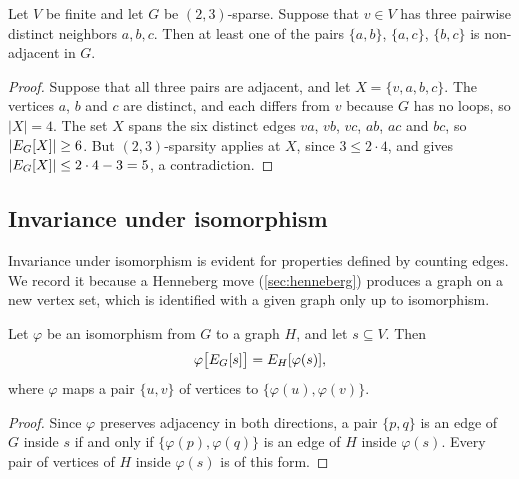 \begin{lemma}
  \label{lem:isSparse-exists-nonadj-among-three-neighbors}
  \leanok
  Let $V$ be finite and let $G$ be $(2,3)$-sparse. Suppose that
  $v \in V$ has three pairwise distinct neighbors $a, b, c$. Then at
  least one of the pairs $\{a, b\}$, $\{a, c\}$, $\{b, c\}$ is
  non-adjacent in $G$.
\end{lemma}
\begin{proof}
  \leanok
  Suppose that all three pairs are adjacent, and let
  $X = \{v, a, b, c\}$. The vertices $a$, $b$ and $c$ are distinct, and
  each differs from $v$ because $G$ has no loops, so $|X| = 4$. The set
  $X$ spans the six distinct edges $va$, $vb$, $vc$, $ab$, $ac$ and
  $bc$, so $|\edgesIn{X}| \ge 6$. But $(2,3)$-sparsity applies at $X$,
  since $3 \le 2 \cdot 4$, and gives
  $|\edgesIn{X}| \le 2 \cdot 4 - 3 = 5$, a contradiction.
\end{proof}

\subsection{Invariance under isomorphism}

Invariance under isomorphism is evident for properties defined by
counting edges. We record it because a Henneberg move
(\cref{sec:henneberg}) produces a graph on a new vertex set, which is
identified with a given graph only up to isomorphism.

\begin{lemma}
  \label{lem:iso-image-edgesIn}
  \leanok
  Let $\varphi$ be an isomorphism from $G$ to a graph $H$, and let
  $s \subseteq V$. Then
  \[
    \varphi\bigl[\edgesIn[G]{s}\bigr] = \edgesIn[H]{\varphi(s)},
  \]
  where $\varphi$ maps a pair $\{u, v\}$ of vertices to
  $\{\varphi(u), \varphi(v)\}$.
\end{lemma}
\begin{proof}
  \leanok
  Since $\varphi$ preserves adjacency in both directions, a pair
  $\{p, q\}$ is an edge of $G$ inside $s$ if and only if
  $\{\varphi(p), \varphi(q)\}$ is an edge of $H$ inside $\varphi(s)$.
  Every pair of vertices of $H$ inside $\varphi(s)$ is of this form.
\end{proof}

